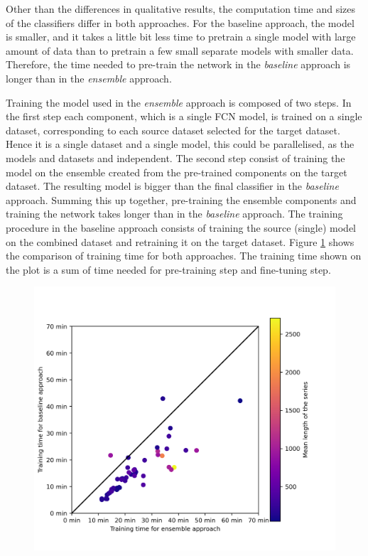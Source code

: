 \documentclass[a4paper,11pt,twoside]{report}
\theoremstyle{definition}
\begin{document}
Other than the differences in qualitative results, the computation time and sizes of the classifiers differ in both approaches.
For the baseline approach, the model is smaller, and it takes a little bit less time to pretrain a single model with large amount of data than to pretrain a few small separate models with smaller data. Therefore, the time needed to pre-train  the network in the \textit{baseline} approach is longer than in the \textit{ensemble} approach.

Training the model used in the \textit{ensemble} approach is composed of two steps. In the first step each component, which is a single FCN model, is trained on a single dataset, corresponding to each source dataset selected for the target dataset. Hence it is a single dataset and a single model, this could be parallelised, as the models and datasets and independent. The second step consist of training the model on the ensemble created from the pre-trained components on the target dataset. The resulting model is bigger than the final classifier in the \textit{baseline} approach. Summing this up together, pre-training the ensemble components and training the network takes longer than in the \textit{baseline} approach. The training procedure in the baseline approach consists of training the source (single) model on the combined dataset and retraining it on the target dataset.
Figure \ref{fig:baseline_ensemble_traning_time} shows the comparison of training time for both approaches.  The training time shown on the plot is a sum of time needed for pre-training step and fine-tuning step.
\FloatBarrier
\begin{figure}[h!t]
\centering
\includegraphics[width=17cm]{imgs/baseline_vs_ensemble/times_comparison.png}
\caption{}
\label{fig:baseline_ensemble_traning_time}
\end{figure}
\end{document}
